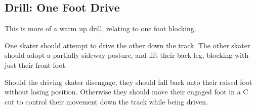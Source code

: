 \subsection*{Drill: One Foot Drive}
\label{drill:one_on_one/one_foot_blocking}

This is more of a warm up drill, relating to one foot blocking.

One skater should attempt to drive the other down the track.
The other skater should adopt a partially sideway posture, and lift their back leg, blocking with just their front foot. 

Should the driving skater disengage, they should fall back onto their raised foot without losing position. 
Otherwise they should move their engaged foot in a C cut to control their movement down the track while being driven. 



